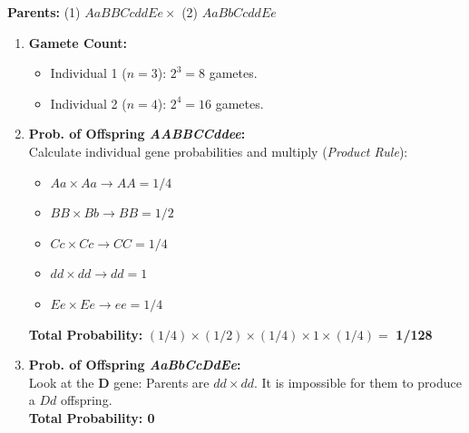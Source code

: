 \documentclass[11pt, letterpaper]{article}
\begin{document}
\begin{tcolorbox}[colback=white, colframe=sectionteal, title={\bfseries Part 2: Multihybrid Cross Probabilities}, arc=3pt, boxrule=1pt]
\textbf{Parents:} (1) $AaBBCcddEe \times$ (2) $AaBbCcddEe$

\begin{enumerate}[leftmargin=*]
    \item \textbf{Gamete Count:}
    \begin{itemize}
        \item Individual 1 ($n=3$): $2^3 = 8$ gametes.
        \item Individual 2 ($n=4$): $2^4 = 16$ gametes.
    \end{itemize}
    
    \item \textbf{Prob. of Offspring \textit{AABBCCddee}:} \\
    Calculate individual gene probabilities and multiply (\textit{Product Rule}):
    \begin{itemize}[noitemsep]
        \item $Aa \times Aa \to AA = 1/4$
        \item $BB \times Bb \to BB = 1/2$
        \item $Cc \times Cc \to CC = 1/4$
        \item $dd \times dd \to dd = 1$
        \item $Ee \times Ee \to ee = 1/4$
    \end{itemize}
    \textbf{Total Probability:} $(1/4) \times (1/2) \times (1/4) \times 1 \times (1/4) = $ \textbf{1/128}

    \item \textbf{Prob. of Offspring \textit{AaBbCcDdEe}:} \\
    Look at the \textbf{D} gene: Parents are $dd \times dd$. It is impossible for them to produce a $Dd$ offspring. \\
    \textbf{Total Probability: 0}
\end{enumerate}
\end{tcolorbox}
\end{document}
